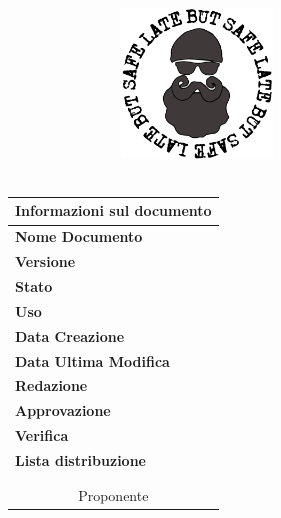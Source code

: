 %
%
%

\thispagestyle{empty}

\begin{titlepage}
	\begin{center}
		\dataUM\\	
		\vspace{2cm}
		\includegraphics[width=10cm, height=4cm]{../logo}\\
		\vspace{2cm}
		\Huge{\bfseries{\titoloDoc}}\\
		\vfill
	
		\begin{table}[h]
			\begin{center}
			\begin{tabular}{l  l}
				\multicolumn{2}{c}{\textbf{Informazioni sul documento}}\\
				\midrule
				\textbf{Nome Documento}	&	\titoloDoc	\\
				\textbf{Versione}	&	\versione	\\
				\textbf{Stato}	&	\emph{\stato}	\\
				\textbf{Uso}	&	\emph{\uso}	\\
				\textbf{Data Creazione}	&	\dataCreazione	\\
				\textbf{Data Ultima Modifica}	&	\dataUM	\\
				\textbf{Redazione}	&	\redaz \\
				\textbf{Approvazione}	&	\appr \\
				\textbf{Verifica}	&	\verif \\
				\textbf{Lista distribuzione}	&	\emph{\gruppo} 	\\
				\multicolumn{2}{c}{\Vardanega}	\\
				\multicolumn{2}{c}{\Cardin}	\\
				\multicolumn{2}{c}{Proponente \Zucchetti}	\\
			\end{tabular}
			\end{center}
		\end{table}
	\end{center}
\end{titlepage}